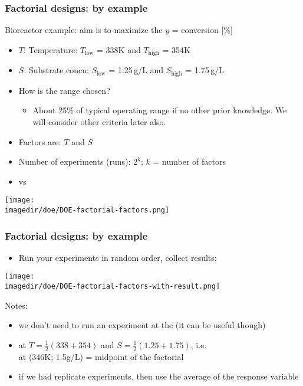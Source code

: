 \begin{frame}\frametitle{Factorial designs: by example}

	Bioreactor example: aim is to maximize the $y$ = conversion [\%]
	\begin{itemize}
		\item	$T$: Temperature: $T_\text{low}$ = 338K and $T_\text{high}$ = 354K
		\item	$S$: Substrate concn: $S_\text{low}$ = 1.25\,g/L and $S_\text{high}$ = 1.75\,g/L
		\item	How is the range chosen?
		\begin{itemize}
			\item	About 25\% of typical operating range if no other prior knowledge. We will consider other criteria later also.
		\end{itemize}
	\end{itemize}
	\begin{itemize}
		\item	Factors are: $T$ and $S$
		\item	Number of experiments (runs): $2^k$; $k$ = number of factors
		\item	{\color{purple}{Standard order}} vs {\color{purple}{Actual execution (run) order}}
	\end{itemize}
	\begin{center}
		\texttt{[image: \\imagedir/doe/DOE-factorial-factors.png]}
	\end{center}
\end{frame}

\begin{frame}\frametitle{Factorial designs: by example}
	\begin{itemize}
		\item	Run your experiments in random order, collect results:
	\end{itemize}
	\begin{center}
		\texttt{[image: \\imagedir/doe/DOE-factorial-factors-with-result.png]}
	\end{center}
	Notes:
	\begin{itemize}
		\item	we don't need to run an experiment at the {\color{purple}{baseline}} (it can be useful though)
		\item	{\color{purple}{baseline}} at $T=\frac{1}{2}\left(338+354\right)$ and $S = \frac{1}{2}\left(1.25+1.75\right)$, i.e. \\
		        {\color{purple}{baseline}} at (346K; 1.5g/L) = midpoint of the factorial
		\item	if we had replicate experiments, then use the average of the response variable
	\end{itemize}
\end{frame}

